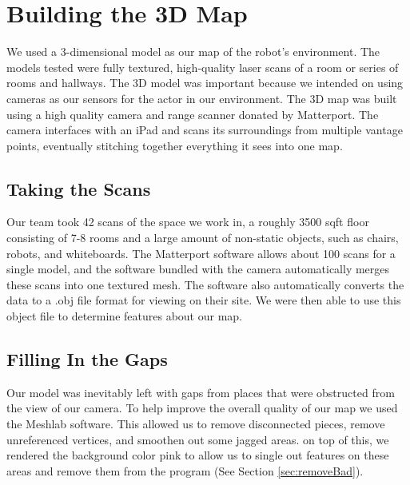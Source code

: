 \documentclass[a4paper,11pt]{article}
\begin{document}


  \section{Building the 3D Map}
  We used a 3-dimensional model as our map of the robot's environment. The models tested were fully textured, high-quality laser scans of a room or series of rooms and hallways. The 3D model was important because we intended on using cameras as our sensors for the actor in our environment. The 3D map was built using a high quality camera and range scanner donated by Matterport. The camera interfaces with an iPad and scans its surroundings from multiple vantage points, eventually stitching together everything it sees into one map. %
  
  \subsection{Taking the Scans}
 Our team took 42 scans of the space we work in, a roughly 3500 sqft floor consisting of 7-8 rooms and a large amount of non-static objects, such as chairs, robots, and whiteboards. The Matterport software allows about 100 scans for a single model, and the software bundled with the camera automatically merges these scans into one textured mesh. The software also automatically converts the data to a .obj file format for viewing on their site. We were then able to use this object file to determine features about our map.

  \subsection{Filling In the Gaps}
  Our model was inevitably left with gaps from places that were obstructed from the view of our camera. To help improve the overall quality of our map we used the Meshlab software. This allowed us to remove disconnected pieces, remove unreferenced vertices, and smoothen out some jagged areas. on top of this, we rendered the background color pink to allow us to single out features on these areas and remove them from the program (See Section \ref{sec:removeBad}).
  
\end{document}
